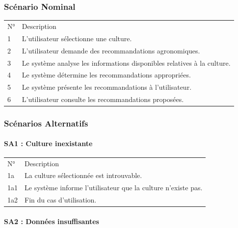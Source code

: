 \documentclass[
]{article}
\begin{document}
\hypertarget{scuxe9nario-nominal-4}{%
\subsubsection{Scénario Nominal}\label{scuxe9nario-nominal-4}}

\begin{longtable}[]{@{}ll@{}}
\toprule
\endhead
N° & Description \\
1 & L'utilisateur sélectionne une culture. \\
2 & L'utilisateur demande des recommandations agronomiques. \\
3 & Le système analyse les informations disponibles relatives à la
culture. \\
4 & Le système détermine les recommandations appropriées. \\
5 & Le système présente les recommandations à l'utilisateur. \\
6 & L'utilisateur consulte les recommandations proposées. \\
\bottomrule
\end{longtable}

\hypertarget{scuxe9narios-alternatifs-4}{%
\subsubsection{Scénarios Alternatifs}\label{scuxe9narios-alternatifs-4}}

\hypertarget{sa1-culture-inexistante-2}{%
\paragraph{SA1 : Culture inexistante}\label{sa1-culture-inexistante-2}}

\begin{longtable}[]{@{}ll@{}}
\toprule
\endhead
N° & Description \\
1a & La culture sélectionnée est introuvable. \\
1a1 & Le système informe l'utilisateur que la culture n'existe pas. \\
1a2 & Fin du cas d'utilisation. \\
\bottomrule
\end{longtable}

\hypertarget{sa2-donnuxe9es-insuffisantes}{%
\paragraph{SA2 : Données
insuffisantes}\label{sa2-donnuxe9es-insuffisantes}}
\end{document}

